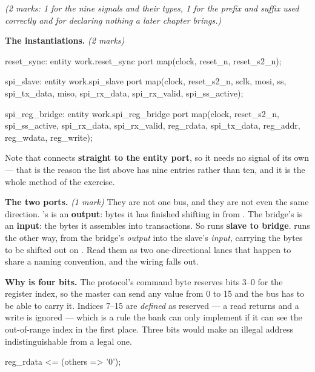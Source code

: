 {\itshape (2 marks: 1 for the nine signals and their types, 1 for the  prefix and
 suffix used correctly and for declaring nothing a later chapter brings.)\par}

\medskip
\textbf{The instantiations.} \textit{(2 marks)}

\begin{vhdlcode}
    reset_sync: entity work.reset_sync
        port map(clock, reset_n, reset_s2_n);

    spi_slave: entity work.spi_slave
        port map(clock, reset_s2_n, sclk, mosi, ss, spi_tx_data,
                 miso, spi_rx_data, spi_rx_valid, spi_ss_active);

    spi_reg_bridge: entity work.spi_reg_bridge
        port map(clock, reset_s2_n, spi_ss_active, spi_rx_data, spi_rx_valid, reg_rdata,
                 spi_tx_data, reg_addr, reg_wdata, reg_write);
\end{vhdlcode}

\noindent Note that  connects \textbf{straight to the entity port}, so it needs no signal
of its own --- that is the reason the list above has nine entries rather than ten, and it is the
whole method of the exercise.

\textbf{The two  ports.} \textit{(1 mark)} They are not one bus, and they are not even
the same direction. 's  is an \textbf{output}: bytes it has finished
shifting in from . The bridge's  is an \textbf{input}: the bytes it
assembles into transactions. So  runs \textbf{slave to bridge}. 
runs the other way, from the bridge's  \emph{output} into the slave's 
\emph{input}, carrying the bytes to be shifted out on . Read them as two one-directional
lanes that happen to share a naming convention, and the wiring falls out.

\textbf{Why  is four bits.} The protocol's command byte reserves bits 3--0 for the
register index, so the master can send any value from 0 to 15 and the bus has to be able to carry
it. Indices 7--15 are \emph{defined} as reserved --- a read returns  and a write is
ignored --- which is a rule the bank can only implement if it can see the out-of-range index in the
first place. Three bits would make an illegal address indistinguishable from a legal one.

\begin{vhdlcode}
    reg_rdata <= (others => '0');
\end{vhdlcode}

